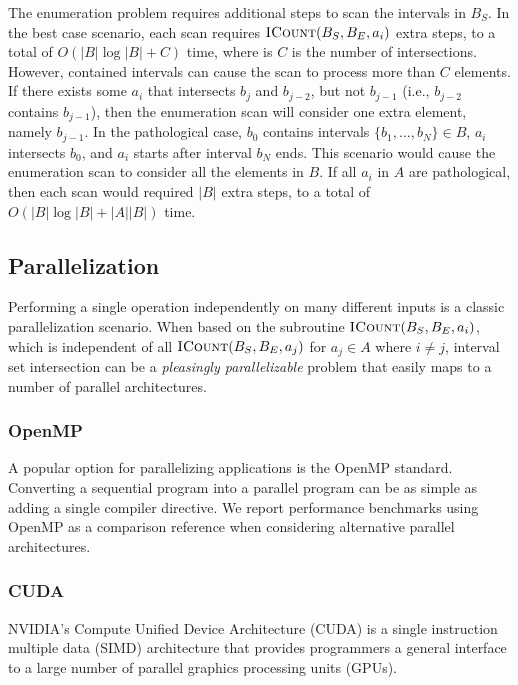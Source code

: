 \documentclass{bioinfo}
\begin{document}
	The enumeration problem requires additional steps to scan the
	intervals in $B_S$.  In the best case scenario, each scan requires
	$\textsc{ICount}(B_S,B_E,a_i)$ extra steps, to a total of $O(|B| \log |B|
	+ C)$ time, where is $C$ is the number of intersections.
	However,
	contained intervals can cause the scan to process more than $C$
	elements.  If there exists some $a_i$ that intersects $b_{j}$ and
	$b_{j-2}$, but not $b_{j-1}$ (i.e., $b_{j-2}$ contains $b_{j-1}$),
	then the enumeration scan will consider one extra element, namely
	$b_{j-1}$.  In the pathological case, $b_0$ contains intervals $\{b_1,
	\dots, b_N\} \in B$, $a_i$ intersects $b_0$, and $a_i$ starts after
	interval $b_N$ ends.  This scenario would cause the enumeration scan
	to consider all the elements in $B$.  If all $a_i$ in $A$ are
	pathological, then each scan would required $|B|$ extra steps, to a
	total of $O(|B| \log |B| + |A||B|)$ time.

	\subsection{Parallelization}

	Performing a single operation independently on many different inputs
	is a classic parallelization scenario.  When based on the subroutine
	$\textsc{ICount}(B_S,B_E,a_i)$, which is independent of all 
	$\textsc{ICount}(B_S,B_E,a_j)$
	for $a_j \in A$ where $i \neq j$, interval set intersection can be a
	{\em pleasingly parallelizable} problem that easily maps to a number
	of parallel architectures.

	\subsubsection{OpenMP}

	A popular option for parallelizing applications is the OpenMP standard.
	Converting a sequential program into a parallel program can be as simple as
	adding a single compiler directive.  We report performance benchmarks using
	OpenMP as a comparison reference when considering alternative parallel
	architectures.

	\subsubsection{CUDA}

	NVIDIA's Compute Unified Device Architecture (CUDA) is a single
	instruction multiple data (SIMD) architecture that provides
	programmers a general interface to a large number of parallel graphics
	processing units (GPUs).
\end{document}
